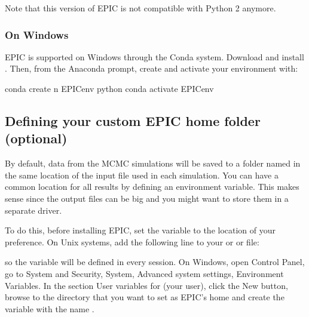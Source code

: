 \documentclass[letterpaper,12pt,english]{sphinxhowto}
\begin{document}
Note that this version of EPIC is not compatible with Python 2 anymore.


\subsubsection{On Windows}
\label{\detokenize{howtoinstall:on-windows}}
EPIC is supported on Windows through the Conda system.
Download and install .
Then, from the Anaconda prompt, create and activate your environment with:

%
\begin{sphinxVerbatim}[commandchars=\\\{\}]
\PYGZdl{} conda create \PYGZhy{}n EPIC\PYGZhy{}env python
\PYGZdl{} conda activate EPIC\PYGZhy{}env
\end{sphinxVerbatim}


\subsection{Defining your custom EPIC home folder (optional)}
\label{\detokenize{howtoinstall:defining-your-custom-epic-home-folder-optional}}
By default, data from the MCMC simulations will be saved to a folder named
 in the same location of the input  file used in each
simulation.
You can have a common location for all results by defining an environment
variable.
This makes sense since the output files can be big and you might want to store
them in a separate driver.

To do this, before installing EPIC, set the variable  to the
location of your preference.
On Unix systems, add the following line to your  or
 or  file:

%
\begin{sphinxVerbatim}[commandchars=\\\{\}]
 
\end{sphinxVerbatim}

so the variable will be defined in every session.
On Windows, open Control Panel, go to System and Security, System, Advanced
system settings, Environment Variables.
In the section User variables for (your user), click the New button, browse to
the directory that you want to set as EPIC’s home and create the variable with
the name .
\end{document}
